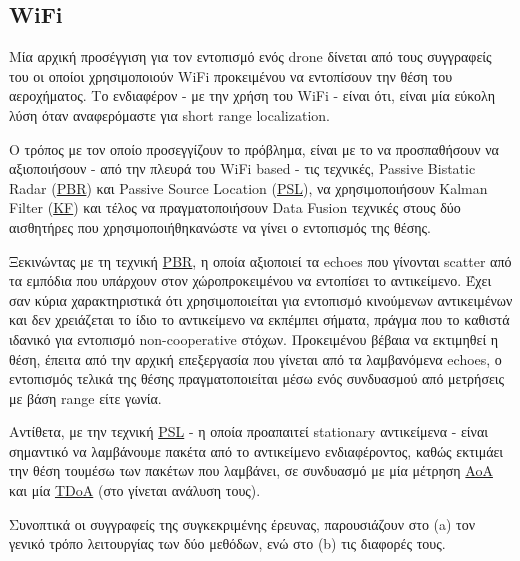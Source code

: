  
\subsection{WiFi}
Μία αρχική προσέγγιση για τον εντοπισμό ενός drone δίνεται από τους συγγραφείς του \cite{wifi-passive-active-drone-localization}
οι οποίοι χρησιμοποιούν WiFi προκειμένου να εντοπίσουν την θέση του αεροχήματος. Το ενδιαφέρον - με την χρήση του WiFi - είναι ότι, 
είναι μία εύκολη λύση όταν αναφερόμαστε για short range localization. 

Ο τρόπος με τον οποίο προσεγγίζουν το πρόβλημα, είναι με 
το να προσπαθήσουν να αξιοποιήσουν - από την πλευρά του WiFi based - τις τεχνικές, 
Passive Bistatic Radar (\hyperref[abbr:PBR]{PBR}) και Passive Source Location (\hyperref[abbr:PSL]{PSL}), να χρησιμοποιήσουν Kalman Filter (\hyperref[abbr:KF]{KF})
και τέλος να πραγματοποιήσουν Data Fusion τεχνικές στους δύο αισθητήρες που χρησιμοποιήθηκαν\udot ώστε να γίνει ο εντοπισμός της θέσης.

Ξεκινώντας με τη τεχνική \hyperref[abbr:PBR]{PBR}, η οποία αξιοποιεί τα echoes που
γίνονται scatter από τα εμπόδια που υπάρχουν στον χώρο\udot προκειμένου να εντοπίσει το αντικείμενο. Έχει σαν κύρια χαρακτηριστικά 
ότι χρησιμοποιείται για εντοπισμό κινούμενων αντικειμένων και δεν χρειάζεται το ίδιο το αντικείμενο να εκπέμπει σήματα, πράγμα που το καθιστά ιδανικό για εντοπισμό 
non-cooperative στόχων. Προκειμένου βέβαια να εκτιμηθεί η θέση, έπειτα από την αρχική επεξεργασία που γίνεται από τα λαμβανόμενα echoes, ο εντοπισμός τελικά της θέσης
πραγματοποιείται μέσω ενός συνδυασμού από μετρήσεις με βάση range είτε γωνία. 

Αντίθετα, με την τεχνική \hyperref[abbr:PSL]{PSL} - η οποία προαπαιτεί stationary αντικείμενα - είναι σημαντικό να λαμβάνουμε πακέτα από το αντικείμενο ενδιαφέροντος,
καθώς εκτιμάει την θέση του\udot μέσω των πακέτων που λαμβάνει, σε συνδυασμό με μία μέτρηση \hyperref[abbr:AoA]{AoA} και μία \hyperref[abbr:TDoA]{TDoA}
(στο  γίνεται ανάλυση τους).

Συνοπτικά οι συγγραφείς της συγκεκριμένης έρευνας, παρουσιάζουν στο  (a) τον γενικό τρόπο λειτουργίας των δύο μεθόδων, ενώ στο
 (b) τις διαφορές τους.

